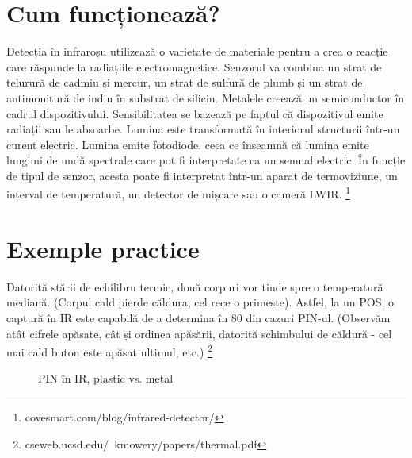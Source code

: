 \section{Cum funcționează?}

\quad Detecția în infraroșu utilizează o varietate de materiale pentru a crea o reacție care răspunde la radiațiile electromagnetice. Senzorul va combina un strat de telurură de cadmiu și mercur, un strat de sulfură de plumb și un strat de antimonitură de indiu în substrat de siliciu. Metalele creează un semiconductor în cadrul dispozitivului. Sensibilitatea se bazează pe faptul că dispozitivul emite radiații sau le absoarbe. Lumina este transformată în interiorul structurii într-un curent electric. Lumina emite fotodiode, ceea ce înseamnă că lumina emite lungimi de undă spectrale care pot fi interpretate ca un semnal electric. În funcție de tipul de senzor, acesta poate fi interpretat într-un aparat de termoviziune, un interval de temperatură, un detector de mișcare sau o cameră LWIR. \footnote{covesmart.com/blog/infrared-detector/}

\section{Exemple practice}

Datorită stării de echilibru termic, două corpuri vor tinde spre o temperatură mediană. (Corpul cald pierde căldura, cel rece o primește). Astfel, la un POS, o captură în IR este capabilă de a determina în 80 din cazuri PIN-ul. (Observăm atât cifrele apăsate, cât și ordinea apăsării, datorită schimbului de căldură - cel mai cald buton este apăsat ultimul, etc.) \footnote{cseweb.ucsd.edu/~kmowery/papers/thermal.pdf}

\begin{figure}%
    \centering
    \qquad
    \caption{PIN în IR, plastic vs. metal}%
    \label{fig:example}%
\end{figure}

